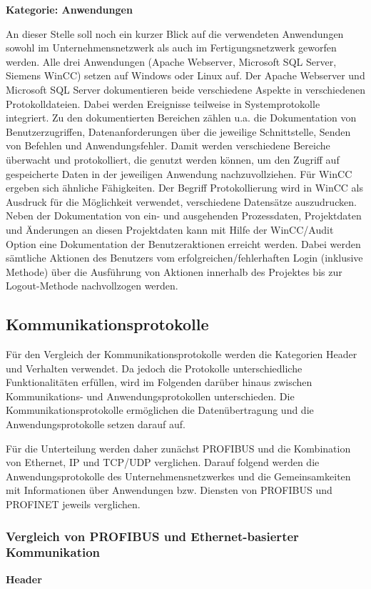 \textbf{Kategorie: Anwendungen}

An dieser Stelle soll noch ein kurzer Blick auf die verwendeten Anwendungen sowohl im Unternehmensnetzwerk als auch im Fertigungsnetzwerk geworfen werden. Alle drei Anwendungen (Apache Webserver, Microsoft SQL Server, Siemens WinCC) setzen auf Windows oder Linux auf. Der Apache Webserver und Microsoft SQL Server dokumentieren beide verschiedene Aspekte in verschiedenen Protokolldateien. Dabei werden Ereignisse teilweise in Systemprotokolle integriert. Zu den dokumentierten Bereichen zählen u.a. die Dokumentation von Benutzerzugriffen, Datenanforderungen über die jeweilige Schnittstelle, Senden von Befehlen und Anwendungsfehler. Damit werden verschiedene Bereiche überwacht und protokolliert, die genutzt werden können, um den Zugriff auf gespeicherte Daten in der jeweiligen Anwendung nachzuvollziehen.
Für WinCC ergeben sich ähnliche Fähigkeiten. Der Begriff \glqq Protokollierung\grqq{} wird in WinCC als Ausdruck für die Möglichkeit verwendet, verschiedene Datensätze auszudrucken. Neben der Dokumentation von ein- und ausgehenden Prozessdaten, Projektdaten und Änderungen an diesen Projektdaten kann mit Hilfe der WinCC/Audit Option eine Dokumentation der Benutzeraktionen erreicht werden. Dabei werden sämtliche Aktionen des Benutzers vom erfolgreichen/fehlerhaften Login (inklusive Methode) über die Ausführung von Aktionen innerhalb des Projektes bis zur Logout-Methode nachvollzogen werden.


\subsection{Kommunikationsprotokolle}
Für den Vergleich der Kommunikationsprotokolle werden die Kategorien \glqq Header\grqq{} und \glqq Verhalten\grqq{} verwendet. Da jedoch die Protokolle unterschiedliche Funktionalitäten erfüllen, wird im Folgenden darüber hinaus zwischen Kommunikations- und Anwendungsprotokollen unterschieden. Die Kommunikationsprotokolle ermöglichen die Datenübertragung und die Anwendungsprotokolle setzen darauf auf.

Für die Unterteilung werden daher zunächst PROFIBUS und die Kombination von Ethernet, IP und TCP/UDP verglichen. Darauf folgend werden die Anwendungsprotokolle des Unternehmensnetzwerkes und die Gemeinsamkeiten mit Informationen über Anwendungen bzw. Diensten von PROFIBUS und PROFINET jeweils verglichen. \\


\subsubsection{Vergleich von PROFIBUS und Ethernet-basierter Kommunikation}
\textbf{Header}

